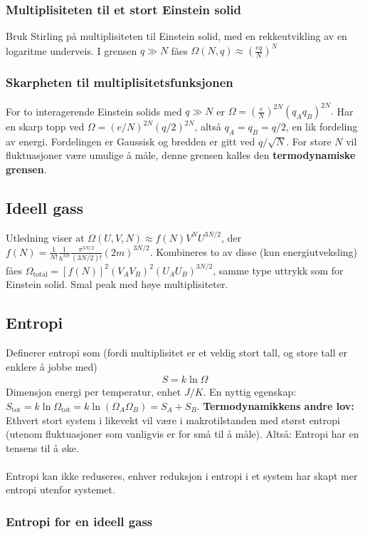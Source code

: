 \documentclass[12pt]{article}
\begin{document}
\subsubsection{Multiplisiteten til et stort Einstein solid}
Bruk Stirling på multiplisiteten til Einstein solid, med en rekkeutvikling av en
logaritme underveis. I grensen $q \gg N$ fåes
$\Omega(N,q) \approx \left(\frac{eq}{N}\right)^N$
\subsubsection{Skarpheten til multiplisitetsfunksjonen}
For to interagerende Einstein solids med $q \gg N$ er $\Omega = \left(\frac{e}{N}\right)^{2N} (q_A q_B)^{2N}.$
Har en skarp topp ved $\Omega = (e/N)^{2N} (q/2)^{2N}$, altså $q_A = q_B = q/2$,
en lik fordeling av energi. Fordelingen er Gaussisk og bredden er gitt ved $q/\sqrt{N}$.
For store $N$ vil fluktuasjoner være umulige å måle, denne grensen kalles den \textbf{termodynamiske grensen}.
\subsection{Ideell gass}
Utledning viser at $\Omega(U,V,N) \approx f(N) V^N U^{3N/2}$, der $f(N) = \frac{1}{N!} \frac{1}{h^{3N}} \frac{\pi^{3N/2}}{(3N/2)!} (2m)^{3N/2}$.
Kombineres to av disse (kun energiutveksling) fåes $\Omega_\text{total} = [f(N)]^2 (V_A V_B)^2 (U_A U_B)^{3N/2}$,
samme type uttrykk som for Einstein solid. Smal peak med høye multiplisiteter.
\subsection{Entropi}
Definerer entropi som (fordi multiplisitet er et veldig stort tall, og store tall er enklere å jobbe med)
\begin{align*}
  S = k \ln{\Omega}
\end{align*}
Dimensjon energi per temperatur, enhet $J/K$. En nyttig egenskap: $S_\text{tot} = k \ln{\Omega_\text{tot}} = k \ln{(\Omega_A \Omega_B)} = S_A + S_B$. \newline \noindent
\textbf{Termodynamikkens andre lov:} Ethvert stort system i likevekt vil være i
makrotilstanden med størst entropi (utenom fluktuasjoner som vanligvis er for små
til å måle). Altså: Entropi har en tensens til å øke.
\\ \\
Entropi kan ikke reduseres, enhver reduksjon i entropi i et system har skapt
mer entropi utenfor systemet.
\subsubsection{Entropi for en ideell gass}
\end{document}
